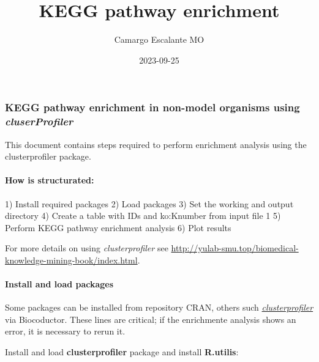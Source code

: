 \documentclass[
]{article}
\title{KEGG pathway enrichment}
\author{Camargo Escalante MO}
\date{2023-09-25}
\newenvironment{Shaded}{\begin{snugshade}}{\end{snugshade}}
\newcommand{\NormalTok}[1]{#1}
\begin{document}
\maketitle

\hypertarget{kegg-pathway-enrichment-in-non-model-organisms-using-cluserprofiler}{%
\subsubsection{\texorpdfstring{KEGG pathway enrichment in non-model
organisms using
\emph{cluserProfiler}}{KEGG pathway enrichment in non-model organisms using cluserProfiler}}\label{kegg-pathway-enrichment-in-non-model-organisms-using-cluserprofiler}}

This document contains steps required to perform enrichment analysis
using the clusterprofiler package.

\hypertarget{how-is-structurated}{%
\paragraph{How is structurated:}\label{how-is-structurated}}

\minitoc

\begin{Shaded}
\begin{Highlighting}[]
\NormalTok{1) Install required packages}
\NormalTok{2) Load packages}
\NormalTok{3) Set the working and output directory}
\NormalTok{4) Create a table with IDs and ko:Knumber from input file 1}
\NormalTok{5) Perform KEGG pathway enrichment analysis}
\NormalTok{6) Plot results}
\end{Highlighting}
\end{Shaded}

For more details on using \emph{clusterprofiler} see
\url{http://yulab-smu.top/biomedical-knowledge-mining-book/index.html}.

\hypertarget{install-and-load-packages}{%
\paragraph{Install and load packages}\label{install-and-load-packages}}

Some packages can be installed from repository CRAN, others such
\href{https://bioconductor.org/packages/release/bioc/html/clusterProfiler.html}{\emph{clusterprofiler}}
via Biocoductor. These lines are critical; if the enrichmente analysis
shows an error, it is necessary to rerun it.

Install and load \textbf{clusterprofiler} package and install
\textbf{R.utilis}:
\end{document}
